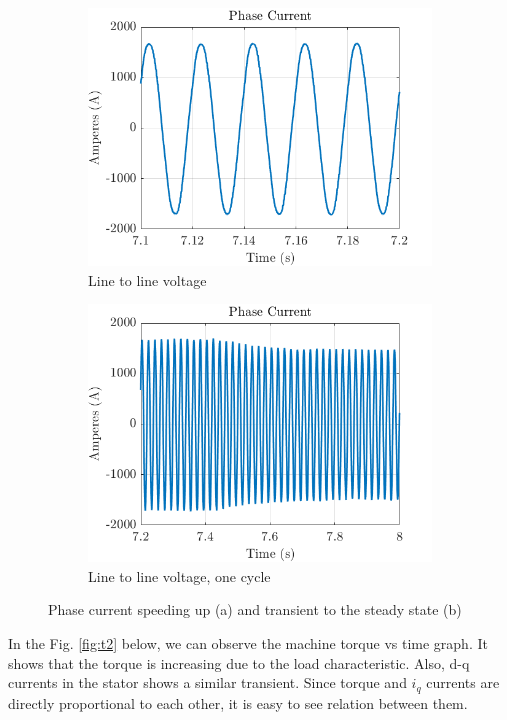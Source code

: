 \begin{figure}[H]
        \centering
        \begin{subfigure}[b]{0.475\textwidth}
            \centering
            \includegraphics[width = 7 cm]{figs/phase_steady.png}
            \caption{Line to line voltage}
            \label{fig:lineC}
        \end{subfigure}
        \hfill
        \begin{subfigure}[b]{0.475\textwidth}  
            \centering 
            \includegraphics[width = 7 cm]{figs/phase_transient.png}
            \caption{Line to line voltage, one cycle}
            \label{fig:lineC_1}
        \end{subfigure}
        \caption{Phase current speeding up (a) and transient to the steady state (b)}
        \label{fig:3phase}
        \end{figure}
        
In the Fig. \ref{fig:t2} below, we can observe the machine torque vs time graph. It shows that the torque is increasing due to the load characteristic. Also, d-q currents in the stator shows a similar transient. Since torque and $i_q$ currents are directly proportional to each other, it is easy to see relation between them.

